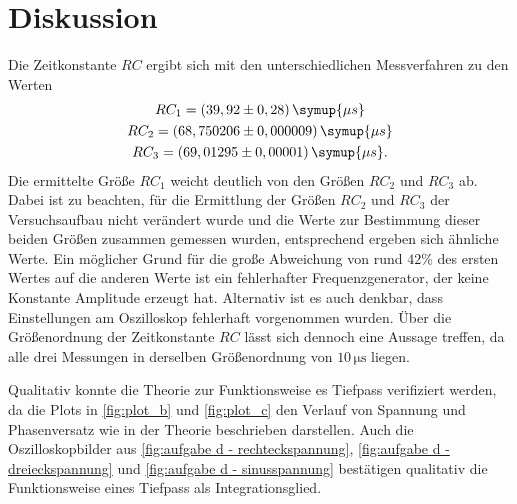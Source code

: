 \section{Diskussion}
\label{sec:Diskussion}
Die Zeitkonstante $RC$ ergibt sich mit den unterschiedlichen Messverfahren zu den Werten
\begin{gather}
    RC_{1} = (39,92\pm0,28)\, \symup{\mu s} \notag \\
    RC_{2} = (68,750206\pm0,000009)\,\symup{\mu s} \notag \\
    RC_{3} = (69,01295\pm0,00001)\,\symup{\mu s} \notag .
\end{gather}
Die ermittelte Größe $RC_{1}$ weicht deutlich von den Größen
$RC_{2}$ und $RC_{3}$ ab. Dabei ist zu beachten, für die Ermittlung der Größen $RC_{2}$ und $RC_{3}$
der Versuchsaufbau nicht verändert wurde und die Werte zur Bestimmung dieser beiden Größen zusammen gemessen wurden,
entsprechend ergeben sich ähnliche Werte. Ein möglicher Grund für die große Abweichung von rund $42\%$ des ersten Wertes 
auf die anderen Werte ist ein fehlerhafter
Frequenzgenerator, der keine Konstante Amplitude erzeugt hat. Alternativ ist es auch denkbar, dass Einstellungen am Oszilloskop
fehlerhaft vorgenommen wurden.
Über die Größenordnung der Zeitkonstante $RC$ lässt sich dennoch eine Aussage treffen, da alle drei Messungen in derselben
Größenordnung von $10\,\unit{\micro\second}$ liegen.

Qualitativ konnte die Theorie zur Funktionsweise es Tiefpass verifiziert werden, da die Plots
in \autoref{fig:plot_b} und \autoref{fig:plot_c} den Verlauf von Spannung und Phasenversatz wie in der Theorie 
beschrieben darstellen.
Auch die Oszilloskopbilder aus \autoref{fig:aufgabe d - rechteckspannung}, \autoref{fig:aufgabe d - dreieckspannung}
und \autoref{fig:aufgabe d - sinusspannung} bestätigen qualitativ die Funktionsweise eines Tiefpass als Integrationsglied.